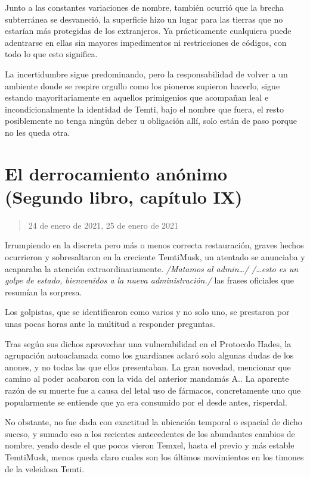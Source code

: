 \documentclass[
  spanish,
]{book}
\begin{document}
Junto a las constantes variaciones de nombre, también ocurrió que la brecha subterránea se desvaneció, la superficie hizo un lugar para las tierras que no estarían más protegidas de los extranjeros. Ya prácticamente cualquiera puede adentrarse en ellas sin mayores impedimentos ni restricciones de códigos, con todo lo que esto significa.

La incertidumbre sigue predominando, pero la responsabilidad de volver a un ambiente donde se respire orgullo como los pioneros supieron hacerlo, sigue estando mayoritariamente en aquellos primigenios que acompañan leal e incondicionalmente la identidad de Temti, bajo el nombre que fuera, el resto posiblemente no tenga ningún deber u obligación allí, solo están de paso porque no les queda otra.

\hypertarget{el-derrocamiento-anuxf3nimo-segundo-libro-capuxedtulo-ix}{%
\section{El derrocamiento anónimo (Segundo libro, capítulo IX)}\label{el-derrocamiento-anuxf3nimo-segundo-libro-capuxedtulo-ix}}

\begin{quote}
24 de enero de 2021, 25 de enero de 2021
\end{quote}

Irrumpiendo en la discreta pero más o menos correcta restauración, graves hechos ocurrieron y sobresaltaron en la creciente TemtiMusk, un atentado se anunciaba y acaparaba la atención extraordinariamente. \emph{/Matamos al admin\ldots/} \emph{/\ldots esto es un golpe de estado, bienvenidos a la nueva administración./} las frases oficiales que resumían la sorpresa.

Los golpistas, que se identificaron como varios y no solo uno, se prestaron por unas pocas horas ante la multitud a responder preguntas.

Tras según sus dichos aprovechar una vulnerabilidad en el Protocolo Hades, la agrupación autoaclamada como los guardianes aclaró solo algunas dudas de los anones, y no todas las que ellos presentaban. La gran novedad, mencionar que camino al poder acabaron con la vida del anterior mandamás A.. La aparente razón de su muerte fue a causa del letal uso de fármacos, concretamente uno que popularmente se entiende que ya era consumido por el desde antes, risperdal.

No obstante, no fue dada con exactitud la ubicación temporal o espacial de dicho suceso, y sumado eso a los recientes antecedentes de los abundantes cambios de nombre, yendo desde el que pocos vieron Temxel, hasta el previo y más estable TemtiMusk, menos queda claro cuales son los últimos movimientos en los timones de la veleidosa Temti.
\end{document}
